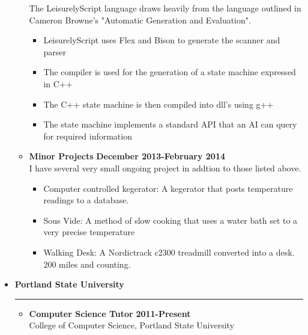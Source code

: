 \documentclass[overlapped]{res}
\begin{document}
\begin{resume}
\begin{itemize}[leftmargin=0in]
\begin{itemize}[leftmargin=0in]
\begin{samepage}
                    The LeisurelyScript language draws heavily from the language 
                    outlined in Cameron Browne's "Automatic Generation and Evaluation".
                    \begin{itemize}
                        \item[\textbullet] LeisurelyScript uses Flex and Bison to generate the scanner and parser
                        \item[\textbullet] The compiler is used for the generation of a state machine expressed in C++
                        \item[\textbullet] The C++ state machine is then compiled into dll's using g++
                        \item[\textbullet] The state machine implements a standard API that an AI can query for required information
                    \end{itemize}
                \end{samepage}
            \item[] 
                \begin{samepage}
                    \textbf{Minor Projects} \hfill \textbf{December 2013-February 2014} \\
                    I have several very small ongoing project in addtion to those listed above.
                    \begin{itemize}
                        \item[\textbullet] Computer controlled kegerator:  A kegerator that posts temperature readings to a database.
                        \item[\textbullet] Sous Vide:  A method of slow cooking that uses a water bath set to a very precise temperature
                        \item[\textbullet] Walking Desk:  A Nordictrack c2300 treadmill converted into a desk. 200 miles and counting.
                    \end{itemize}
                \end{samepage}
        \end{itemize}
\end{itemize}
\vspace{0.25in}

\begin{itemize}[leftmargin=0in]
    \item[] \textbf{Portland State University} \\[-0.1in] \rule{\textwidth}{0.5pt}
        \begin{itemize}[leftmargin=0in]
            \item[] 
                \begin{samepage}
                    \textbf{Computer Science Tutor} \hfill \textbf{2011-Present} \\
                    College of Computer Science, Portland State University \hfill


\end{samepage}
\end{itemize}
\end{itemize}
\end{resume}
\end{document}

